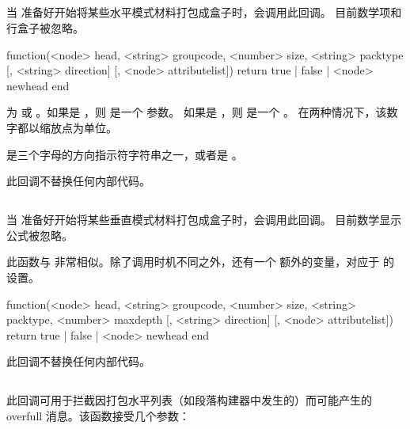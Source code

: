 \subsection{}


当 \TEX 准备好开始将某些水平模式材料打包成盒子时，会调用此回调。
目前数学项和行盒子被忽略。

\begin{typing}
function(<node> head, <string> groupcode, <number> size,
         <string> packtype [, <string> direction] [, <node> attributelist])
    return true | false | <node> newhead
end
\end{typing}

 为  或 。如果是
，则  是一个  参数。
如果是 ，则  是一个 。
在两种情况下，该数字都以缩放点为单位。

 是三个字母的方向指示符字符串之一，或者是 。

此回调不替换任何内部代码。

\subsection{}


当 \TEX 准备好开始将某些垂直模式材料打包成盒子时，会调用此回调。
目前数学显示公式被忽略。

此函数与  非常相似。除了调用时机不同之外，还有一个
额外的变量，对应于 \TEX 的  设置。

\begin{typing}
function(<node> head, <string> groupcode, <number> size, <string> packtype,
        <number> maxdepth [, <string> direction] [, <node> attributelist])
    return true | false | <node> newhead
end
\end{typing}

此回调不替换任何内部代码。

\subsection{}


此回调可用于拦截因打包水平列表（如段落构建器中发生的）而可能产生的
overfull 消息。该函数接受几个参数：

